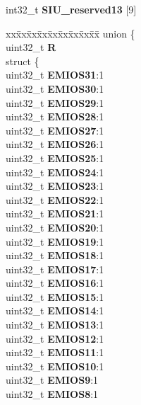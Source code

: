 \begin{DoxyCompactItemize}
\begin{tabbing}
\end{tabbing}\item 
\mbox{\label{structSIU__tag_a141ad2e303ee186df56cc9b2b0b88246}} 
int32\+\_\+t {\bfseries S\+I\+U\+\_\+reserved13} \mbox{[}9\mbox{]}
\item 
\mbox{\label{structSIU__tag_a6bd975cf3cc97eb4e82c2a8798c9c0c8}} 
\begin{tabbing}
xx\=xx\=xx\=xx\=xx\=xx\=xx\=xx\=xx\=\kill
union \{\\
\>uint32\_t {\bfseries R}\\
\>struct \{\\
\>\>uint32\_t {\bfseries EMIOS31}:1\\
\>\>uint32\_t {\bfseries EMIOS30}:1\\
\>\>uint32\_t {\bfseries EMIOS29}:1\\
\>\>uint32\_t {\bfseries EMIOS28}:1\\
\>\>uint32\_t {\bfseries EMIOS27}:1\\
\>\>uint32\_t {\bfseries EMIOS26}:1\\
\>\>uint32\_t {\bfseries EMIOS25}:1\\
\>\>uint32\_t {\bfseries EMIOS24}:1\\
\>\>uint32\_t {\bfseries EMIOS23}:1\\
\>\>uint32\_t {\bfseries EMIOS22}:1\\
\>\>uint32\_t {\bfseries EMIOS21}:1\\
\>\>uint32\_t {\bfseries EMIOS20}:1\\
\>\>uint32\_t {\bfseries EMIOS19}:1\\
\>\>uint32\_t {\bfseries EMIOS18}:1\\
\>\>uint32\_t {\bfseries EMIOS17}:1\\
\>\>uint32\_t {\bfseries EMIOS16}:1\\
\>\>uint32\_t {\bfseries EMIOS15}:1\\
\>\>uint32\_t {\bfseries EMIOS14}:1\\
\>\>uint32\_t {\bfseries EMIOS13}:1\\
\>\>uint32\_t {\bfseries EMIOS12}:1\\
\>\>uint32\_t {\bfseries EMIOS11}:1\\
\>\>uint32\_t {\bfseries EMIOS10}:1\\
\>\>uint32\_t {\bfseries EMIOS9}:1\\
\>\>uint32\_t {\bfseries EMIOS8}:1\\

\end{tabbing}
\end{DoxyCompactItemize}
